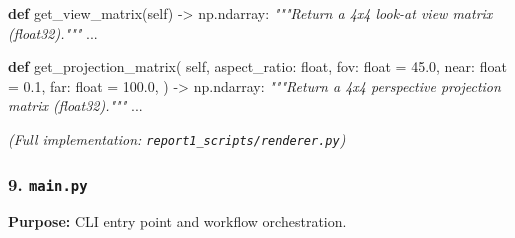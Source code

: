 \documentclass[
  11pt,
]{report}
\newenvironment{Shaded}{}{}
\newcommand{\BuiltInTok}[1]{\textcolor[rgb]{0.00,0.50,0.00}{#1}}
\newcommand{\CommentTok}[1]{\textcolor[rgb]{0.38,0.63,0.69}{\textit{#1}}}
\newcommand{\FloatTok}[1]{\textcolor[rgb]{0.25,0.63,0.44}{#1}}
\newcommand{\KeywordTok}[1]{\textcolor[rgb]{0.00,0.44,0.13}{\textbf{#1}}}
\newcommand{\NormalTok}[1]{#1}
\newcommand{\OperatorTok}[1]{\textcolor[rgb]{0.40,0.40,0.40}{#1}}
\newcommand{\VariableTok}[1]{\textcolor[rgb]{0.10,0.09,0.49}{#1}}
\begin{document}
\begin{Shaded}
\begin{Highlighting}[]
    \KeywordTok{def}\NormalTok{ get\_view\_matrix(}\VariableTok{self}\NormalTok{) }\OperatorTok{{-}\textgreater{}}\NormalTok{ np.ndarray:}
        \CommentTok{"""Return a 4x4 look{-}at view matrix (float32)."""}
\NormalTok{        ...}

    \KeywordTok{def}\NormalTok{ get\_projection\_matrix(}
        \VariableTok{self}\NormalTok{,}
\NormalTok{        aspect\_ratio: }\BuiltInTok{float}\NormalTok{,}
\NormalTok{        fov: }\BuiltInTok{float} \OperatorTok{=} \FloatTok{45.0}\NormalTok{,}
\NormalTok{        near: }\BuiltInTok{float} \OperatorTok{=} \FloatTok{0.1}\NormalTok{,}
\NormalTok{        far: }\BuiltInTok{float} \OperatorTok{=} \FloatTok{100.0}\NormalTok{,}
\NormalTok{    ) }\OperatorTok{{-}\textgreater{}}\NormalTok{ np.ndarray:}
        \CommentTok{"""Return a 4x4 perspective projection matrix (float32)."""}
\NormalTok{        ...}
\end{Highlighting}
\end{Shaded}

\emph{(Full implementation: \texttt{report1\_scripts/renderer.py})}

\subsubsection{\texorpdfstring{9.
\texttt{main.py}}{9. main.py}}\label{main.py}

\textbf{Purpose:} CLI entry point and workflow orchestration.
\end{document}
